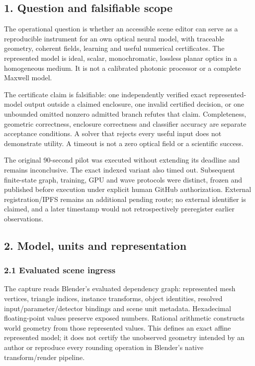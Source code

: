 \documentclass[
  10pt,
]{article}
\begin{document}
\hypertarget{question-and-falsifiable-scope}{%
\subsection{1. Question and falsifiable
scope}\label{question-and-falsifiable-scope}}

The operational question is whether an accessible scene editor can serve
as a reproducible instrument for an own optical neural model, with
traceable geometry, coherent fields, learning and useful numerical
certificates. The represented model is ideal, scalar, monochromatic,
lossless planar optics in a homogeneous medium. It is not a calibrated
photonic processor or a complete Maxwell model.

The certificate claim is falsifiable: one independently verified exact
represented-model output outside a claimed enclosure, one invalid
certified decision, or one unbounded omitted nonzero admitted branch
refutes that claim. Completeness, geometric correctness, enclosure
correctness and classifier accuracy are separate acceptance conditions.
A solver that rejects every useful input does not demonstrate utility. A
timeout is not a zero optical field or a scientific success.

The original 90-second pilot was executed without extending its deadline
and remains inconclusive. The exact indexed variant also timed out.
Subsequent finite-state graph, training, GPU and wave protocols were
distinct, frozen and published before execution under explicit human
GitHub authorization. External registration/IPFS remains an additional
pending route; no external identifier is claimed, and a later timestamp
would not retrospectively preregister earlier observations.

\hypertarget{model-units-and-representation}{%
\subsection{2. Model, units and
representation}\label{model-units-and-representation}}

\hypertarget{evaluated-scene-ingress}{%
\subsubsection{2.1 Evaluated scene
ingress}\label{evaluated-scene-ingress}}

The capture reads Blender's evaluated dependency graph: represented mesh
vertices, triangle indices, instance transforms, object identities,
resolved input/parameter/detector bindings and scene unit metadata.
Hexadecimal floating-point values preserve exposed numbers. Rational
arithmetic constructs world geometry from those represented values. This
defines an exact affine represented model; it does not certify the
unobserved geometry intended by an author or reproduce every rounding
operation in Blender's native transform/render pipeline.
\end{document}
